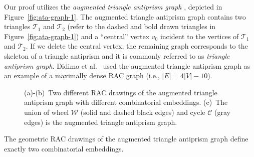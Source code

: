 \documentclass{llncs}
\begin{document}
Our proof utilizes the \emph{augmented triangle antiprism graph}
\cite{ABS11,DEL09}, depicted in Figure~\ref{fig:ata-graph-1}. The
augmented triangle antiprism graph contains two triangles
$\mathcal{T}_1$ and $\mathcal{T}_2$ (refer to the dashed and bold
drawn triangles in Figure~\ref{fig:ata-graph-1}) and a ``central''
vertex $v_0$ incident to the vertices of $\mathcal{T}_1$ and
$\mathcal{T}_2$. If we delete the central vertex, the remaining
graph corresponds to the skeleton of a triangle antiprism and it is
commonly referred to as \emph{triangle antiprism graph}. Didimo et
al.\ \cite{DEL09} used the augmented triangle antiprism graph as an
example of a maximally dense RAC graph (i.e., $|E|=4|V|-10$).


\begin{figure}[h!tb]
  \centering
  \begin{minipage}[b]{.32\textwidth}
     \raggedleft
  \end{minipage}
  \hfill
  \begin{minipage}[b]{.32\textwidth}
     \raggedright
  \end{minipage}
  \hfill
  \begin{minipage}[b]{.32\textwidth}
     \raggedright
  \end{minipage}
  \caption{(a)-(b)~Two different RAC drawings of the augmented triangle antiprism graph with different combinatorial embeddings.
  (c)~The union of wheel $\mathcal{W}$ (solid and dashed black edges) and cycle $\mathcal{C}$ (gray edges) is
  the augmented triangle antiprism graph.}
  \label{fig:ata-graph}
\end{figure}

\begin{lemma}
\label{lem:ata-graph} The geometric RAC drawings of the augmented
triangle antiprism graph define exactly two combinatorial
embeddings.
\end{lemma}
\end{document}
